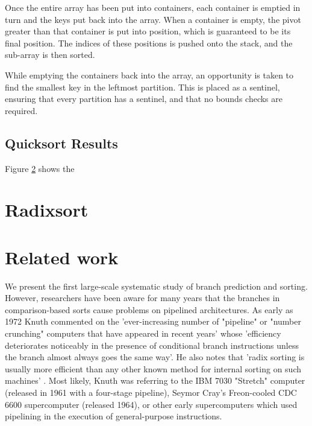 \documentclass[acmtocl]{acmtrans2m}
\begin{document}
Once the entire array has been put into containers, each container is
emptied in turn and the keys put back into the array. When a container
is empty, the pivot greater than that container is put into position,
which is guaranteed to be its final position. The indices of these
positions is pushed onto the stack, and the sub-array is then sorted.

While emptying the containers back into the array, an opportunity is
taken to find the smallest key in the leftmost partition. This is
placed as a sentinel, ensuring that every partition has a sentinel,
and that no bounds checks are required.

\subsection{Quicksort Results}
Figure \ref{} shows the 




\section{Radixsort}



\section{Related work} 


We present the first large-scale systematic study of branch prediction
and sorting. However, researchers have been aware for many years that
the branches in comparison-based sorts cause problems on pipelined
architectures. As early as 1972 Knuth commented on the
'ever-increasing number of "pipeline" or "number crunching" computers
that have appeared in recent years' whose 'efficiency deteriorates
noticeably in the presence of conditional branch instructions unless
the branch almost always goes the same way'. He also notes that 'radix
sorting is usually more efficient than any other known method for
internal sorting on such machines' \cite{Knuth72c}. Most likely, Knuth
was referring to the IBM 7030 "Stretch" computer (released in 1961
with a four-stage pipeline), Seymor Cray's Freon-cooled CDC 6600
supercomputer (released 1964), or other early supercomputers which
used pipelining in the execution of general-purpose instructions.
\end{document}
